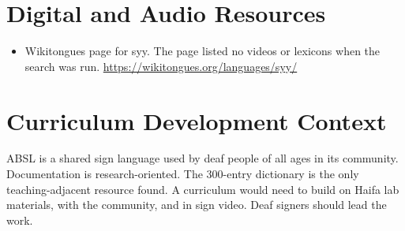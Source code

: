 \documentclass[12pt]{article}
\begin{document}
\section{Digital and Audio Resources}
\begin{itemize}
\item Wikitongues page for syy. The page listed no videos or lexicons when the search was run. \url{https://wikitongues.org/languages/syy/}
\end{itemize}

\section{Curriculum Development Context}
ABSL is a shared sign language used by deaf people of all ages in its community. Documentation is research-oriented. The 300-entry dictionary is the only teaching-adjacent resource found. A curriculum would need to build on Haifa lab materials, with the community, and in sign video. Deaf signers should lead the work.
\end{document}
